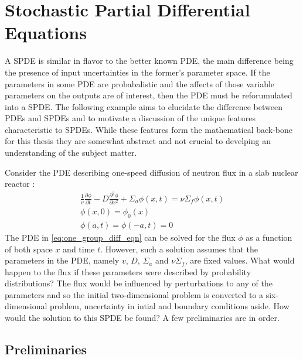 \section{Stochastic Partial Differential Equations} \label{sec:spdes}

A \ac{SPDE} is similar in flavor to the better known \ac{PDE}, the main difference being the presence of input uncertainties in the former's parameter space. If the parameters in some \ac{PDE} are probabalistic and the affects of those variable parameters on the outputs are of interest, then the \ac{PDE} must be reforumulated into a \ac{SPDE}. The following example aims to elucidate the difference between \ac{PDE}s and \ac{SPDE}s and to motivate a discussion of the unique features characteristic to \ac{SPDE}s. While these features form the mathematical back-bone for this thesis they are somewhat abstract and not crucial to develping an understanding of the subject matter. 

Consider the \ac{PDE} describing one-speed diffusion of neutron flux in a slab nuclear reactor \cite{Duderstadt}:
\begin{eqnarray} \label{eq:one_group_diff_eqn} 
   \frac{1}{v} \frac{\partial\phi}{\partial t} 
    - D	\frac{\partial^2\phi}{\partial x^2}
     + \Sigma_{a}\phi(x,t)
      = \nu\Sigma_{f}\phi(x,t) \\
   \phi(x,0) = \phi_{0}(x) \nonumber \\
   \phi(a,t) = \phi(-a,t) = 0 \nonumber
\end{eqnarray}
The \ac{PDE} in \ref{eq:one_group_diff_eqn} can be solved for the flux $\phi$ as a function of both space $x$ and time $t$. However, such a solution assumes that the parameters in the \ac{PDE}, namely $v$, $D$, $\Sigma_a$ and $\nu\Sigma_f$, are fixed values. What would happen to the flux if these parameters were described by probability distributions? The flux would be influenced by perturbations to any of the parameters and so the initial two-dimensional problem is converted to a six-dimensional problem, uncertainty in intial and boundary conditions aside. How would the solution to this \ac{SPDE} be found? A few preliminaries are in order.

\subsection{Preliminaries} \label{subsec:SPDEs_prelims}

